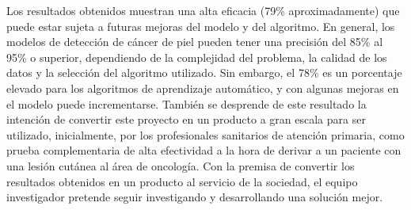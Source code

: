 \begin{conclusions}
    Los resultados obtenidos muestran una alta eficacia (79\% aproximadamente) que puede estar sujeta a futuras mejoras del modelo y del algoritmo. 
    En general, los modelos de detección de cáncer de piel pueden tener una precisión del 85\% al 95\% o superior, dependiendo de la complejidad del problema, la calidad de los datos y la selección del algoritmo utilizado. 
    Sin embargo, el 78\% es un porcentaje elevado para los algoritmos de aprendizaje automático, y con algunas mejoras en el modelo puede incrementarse. 
    También se desprende de este resultado la intención de convertir este proyecto en un producto a gran escala para ser utilizado, inicialmente, por los profesionales sanitarios de atención primaria, como prueba complementaria de alta efectividad a la hora de derivar a un paciente con una lesión cutánea al área de oncología. 
    Con la premisa de convertir los resultados obtenidos en un producto al servicio de la sociedad, el equipo investigador pretende seguir investigando y desarrollando una solución mejor.
  
\end{conclusions}
